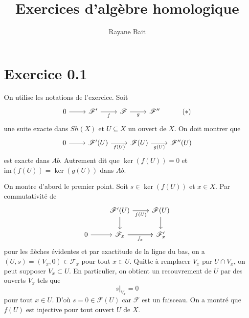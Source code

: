 \documentclass[a4paper,12pt]{article}
\title{Exercices d'algèbre homologique}
\author{Rayane Bait}
\date{ }
\newcommand{\F}{\mathscr F}
\newcommand{\im}{\textrm{im}}
\theoremstyle{plain}
\theoremstyle{definition}
\theoremstyle{remark}
\begin{document}
\maketitle

\section*{Exercice 0.1}
On utilise les notations de l'exercice. Soit 
\[\begin{tikzcd}
	0 & {\F'} & \F & {\F''} & {(*)}
	\arrow[from=1-1, to=1-2]
	\arrow["f"', from=1-2, to=1-3]
	\arrow["g"', from=1-3, to=1-4]
\end{tikzcd}\]
une suite exacte dans $Sh(X)$ et $U\subseteq X$ un ouvert de $X$.
On doit montrer que 
\[\begin{tikzcd}
	0 & {\F'(U)} & {\F(U)} & {\F''(U)}
	\arrow[from=1-1, to=1-2]
	\arrow["{f(U)}"', from=1-2, to=1-3]
	\arrow["{g(U)}"', from=1-3, to=1-4]
\end{tikzcd}\]
est exacte dans $Ab$.
Autrement dit que $\ker(f(U))=0$ et $\im(f(U))=\ker(g(U))$ dans $Ab$.

On montre d'abord le premier point. Soit $s\in \ker(f(U))$ et
$x\in X$. Par commutativité de 
\[\begin{tikzcd}
	& {\F'(U)} & {\F(U)} \\
	0 & {\F_x} & {\F'_x}
	\arrow["{f(U)}"', from=1-2, to=1-3]
	\arrow["{f_x}"', from=2-2, to=2-3]
	\arrow[from=1-2, to=2-2]
	\arrow[from=1-3, to=2-3]
	\arrow[from=2-1, to=2-2]
	\arrow[from=2-2, to=2-3]
\end{tikzcd}\]
pour les flèches évidentes et par exactitude de la ligne du bas,
on a $(U,s)=(V_x,0)\in \F_x$ pour tout $x\in U$. Quitte à remplacer
$V_x$ par $U\cap V_x$, on peut supposer $V_x\subset U$. En particulier,
on obtient un recouvrement de $U$ par des ouverts $V_x$ tels que 
\[s|_{V_x}=0\]
pour tout $x\in U$. D'où $s=0\in \F(U)$ car $\F$ est un faisceau. On a 
montré que $f(U)$ est injective pour tout ouvert $U$ de $X$. 
\end{document}
